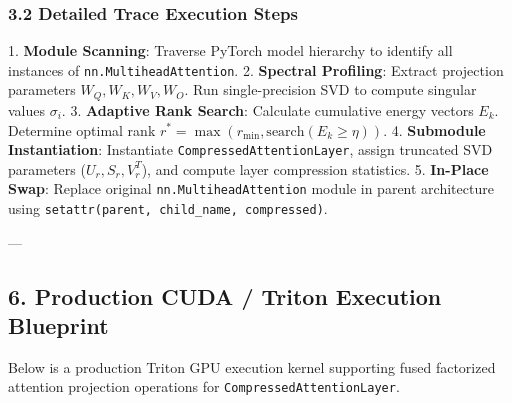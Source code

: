 \subsubsection{3.2 Detailed Trace Execution Steps}
1. \textbf{Module Scanning}: Traverse PyTorch model hierarchy to identify all instances of \texttt{nn.MultiheadAttention}.
2. \textbf{Spectral Profiling}: Extract projection parameters $W_Q, W_K, W_V, W_O$. Run single-precision SVD to compute singular values $\sigma_i$.
3. \textbf{Adaptive Rank Search}: Calculate cumulative energy vectors $E_k$. Determine optimal rank $r^* = \max(r_{\min}, \text{search}(E_k \ge \eta))$.
4. \textbf{Submodule Instantiation}: Instantiate \texttt{CompressedAttentionLayer}, assign truncated SVD parameters ($U_r, S_r, V_r^T$), and compute layer compression statistics.
5. \textbf{In-Place Swap}: Replace original \texttt{nn.MultiheadAttention} module in parent architecture using \texttt{setattr(parent, child_name, compressed)}.

---

\subsection{6. Production CUDA / Triton Execution Blueprint}
Below is a production Triton GPU execution kernel supporting fused factorized attention projection operations for \texttt{CompressedAttentionLayer}.


